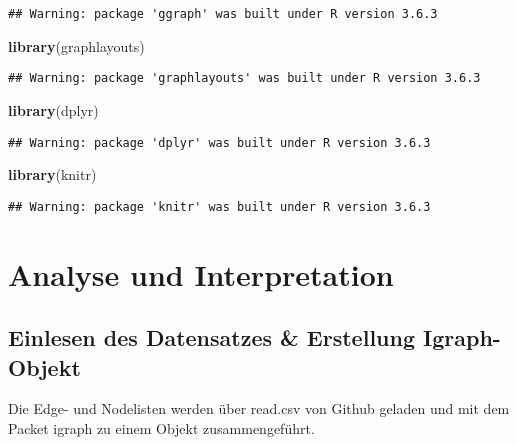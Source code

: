 \documentclass[
]{article}
\newenvironment{Shaded}{\begin{snugshade}}{\end{snugshade}}
\newcommand{\KeywordTok}[1]{\textcolor[rgb]{0.13,0.29,0.53}{\textbf{#1}}}
\newcommand{\NormalTok}[1]{#1}
\begin{document}
\begin{verbatim}
## Warning: package 'ggraph' was built under R version 3.6.3
\end{verbatim}

\begin{Shaded}
\begin{Highlighting}[]
\KeywordTok{library}\NormalTok{(graphlayouts)}
\end{Highlighting}
\end{Shaded}

\begin{verbatim}
## Warning: package 'graphlayouts' was built under R version 3.6.3
\end{verbatim}

\begin{Shaded}
\begin{Highlighting}[]
\KeywordTok{library}\NormalTok{(dplyr)}
\end{Highlighting}
\end{Shaded}

\begin{verbatim}
## Warning: package 'dplyr' was built under R version 3.6.3
\end{verbatim}

\begin{Shaded}
\begin{Highlighting}[]
\KeywordTok{library}\NormalTok{(knitr)}
\end{Highlighting}
\end{Shaded}

\begin{verbatim}
## Warning: package 'knitr' was built under R version 3.6.3
\end{verbatim}

\hypertarget{analyse-und-interpretation}{%
\section{Analyse und Interpretation}\label{analyse-und-interpretation}}

\hypertarget{einlesen-des-datensatzes-erstellung-igraph-objekt}{%
\subsection{Einlesen des Datensatzes \& Erstellung
Igraph-Objekt}\label{einlesen-des-datensatzes-erstellung-igraph-objekt}}

Die Edge- und Nodelisten werden über read.csv von Github geladen und mit
dem Packet igraph zu einem Objekt zusammengeführt.
\end{document}
